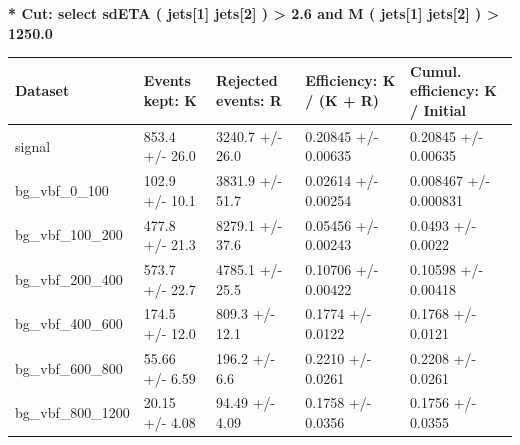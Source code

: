 \documentclass[a4paper, 10pt]{article}
\begin{document}
\textbf{* Cut: select sdETA ( jets[1] jets[2] ) > 2.6 and M ( jets[1] jets[2] ) > 1250.0}\\
   \begin{table}[H]
  \begin{center}
    \begin{tabular}{|m{20.0mm}|m{27.0mm}|m{27.0mm}|m{33.0mm}|m{32.0mm}|}
      \hline
      {\cellcolor{yellow}         Dataset}& {\cellcolor{yellow}         Events kept:
          K}& {\cellcolor{yellow}         Rejected events:
          R}& {\cellcolor{yellow}         Efficiency:
          K /\- (K + R)}& {\cellcolor{yellow}         Cumul. efficiency:
          K /\- Initial}\\
      \hline
      {\cellcolor{white}         signal}& {\cellcolor{white}         853.4 +/\-- 26.0}& {\cellcolor{white}         3240.7 +/\-- 26.0}& {\cellcolor{white}         0.20845 +/\-- 0.00635}& {\cellcolor{white}         0.20845 +/\-- 0.00635}\\
      \hline
      {\cellcolor{white}         bg\_vbf\_0\_100}& {\cellcolor{white}         102.9 +/\-- 10.1}& {\cellcolor{white}         3831.9 +/\-- 51.7}& {\cellcolor{white}         0.02614 +/\-- 0.00254}& {\cellcolor{white}         0.008467 +/\-- 0.000831}\\
      \hline
      {\cellcolor{white}         bg\_vbf\_100\_200}& {\cellcolor{white}         477.8 +/\-- 21.3}& {\cellcolor{white}         8279.1 +/\-- 37.6}& {\cellcolor{white}         0.05456 +/\-- 0.00243}& {\cellcolor{white}         0.0493 +/\-- 0.0022}\\
      \hline
      {\cellcolor{white}         bg\_vbf\_200\_400}& {\cellcolor{white}         573.7 +/\-- 22.7}& {\cellcolor{white}         4785.1 +/\-- 25.5}& {\cellcolor{white}         0.10706 +/\-- 0.00422}& {\cellcolor{white}         0.10598 +/\-- 0.00418}\\
      \hline
      {\cellcolor{white}         bg\_vbf\_400\_600}& {\cellcolor{white}         174.5 +/\-- 12.0}& {\cellcolor{white}         809.3 +/\-- 12.1}& {\cellcolor{white}         0.1774 +/\-- 0.0122}& {\cellcolor{white}         0.1768 +/\-- 0.0121}\\
      \hline
      {\cellcolor{white}         bg\_vbf\_600\_800}& {\cellcolor{white}         55.66 +/\-- 6.59}& {\cellcolor{white}         196.2 +/\-- 6.6}& {\cellcolor{white}         0.2210 +/\-- 0.0261}& {\cellcolor{white}         0.2208 +/\-- 0.0261}\\
      \hline
      {\cellcolor{white}         bg\_vbf\_800\_1200}& {\cellcolor{white}         20.15 +/\-- 4.08}& {\cellcolor{white}         94.49 +/\-- 4.09}& {\cellcolor{white}         0.1758 +/\-- 0.0356}& {\cellcolor{white}         0.1756 +/\-- 0.0355}\\

\end{tabular}
\end{center}
\end{table}
\end{document}
